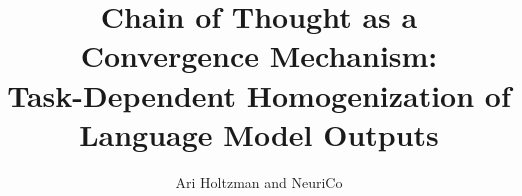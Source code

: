\documentclass{article}
\title{Chain of Thought as a Convergence Mechanism:\\ Task-Dependent Homogenization of Language Model Outputs}
\author{Ari Holtzman and NeuriCo}
\begin{document}
\maketitle

\begin{abstract}

\end{abstract}










\end{document}
